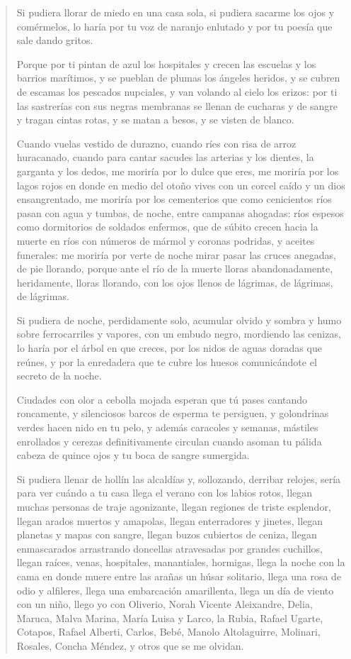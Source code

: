 \documentclass[12pt]{article}
\begin{document}
\clearpage
{}
\begin{verse}
Si pudiera llorar de miedo en una casa sola,
si pudiera sacarme los ojos y comérmelos,
lo haría por tu voz de naranjo enlutado
y por tu poesía que sale dando gritos.

Porque por ti pintan de azul los hospitales
y crecen las escuelas y los barrios marítimos,
y se pueblan de plumas los ángeles heridos,
y se cubren de escamas los pescados nupciales,
y van volando al cielo los erizos:
por ti las sastrerías con sus negras membranas
se llenan de cucharas y de sangre
y tragan cintas rotas, y se matan a besos,
y se visten de blanco.

Cuando vuelas vestido de durazno,
cuando ríes con risa de arroz huracanado,
cuando para cantar sacudes las arterias y los dientes,
la garganta y los dedos,
me moriría por lo dulce que eres,
me moriría por los lagos rojos
en donde en medio del otoño vives
con un corcel caído y un dios ensangrentado,
me moriría por los cementerios
que como cenicientos ríos pasan
con agua y tumbas,
de noche, entre campanas ahogadas:
ríos espesos como dormitorios
de soldados enfermos, que de súbito crecen
hacia la muerte en ríos con números de mármol
y coronas podridas, y aceites funerales:
me moriría por verte de noche
mirar pasar las cruces anegadas,
de pie llorando,
porque ante el río de la muerte lloras
abandonadamente, heridamente,
lloras llorando, con los ojos llenos
de lágrimas, de lágrimas, de lágrimas.

Si pudiera de noche, perdidamente solo,
acumular olvido y sombra y humo
sobre ferrocarriles y vapores,
con un embudo negro,
mordiendo las cenizas,
lo haría por el árbol en que creces,
por los nidos de aguas doradas que reúnes,
y por la enredadera que te cubre los huesos
comunicándote el secreto de la noche.

Ciudades con olor a cebolla mojada
esperan que tú pases cantando roncamente,
y silenciosos barcos de esperma te persiguen,
y golondrinas verdes hacen nido en tu pelo,
y además caracoles y semanas,
mástiles enrollados y cerezas
definitivamente circulan cuando asoman
tu pálida cabeza de quince ojos
y tu boca de sangre sumergida.

Si pudiera llenar de hollín las alcaldías
y, sollozando, derribar relojes,
sería para ver cuándo a tu casa
llega el verano con los labios rotos,
llegan muchas personas de traje agonizante,
llegan regiones de triste esplendor,
llegan arados muertos y amapolas,
llegan enterradores y jinetes,
llegan planetas y mapas con sangre,
llegan buzos cubiertos de ceniza,
llegan enmascarados arrastrando doncellas
atravesadas por grandes cuchillos,
llegan raíces, venas, hospitales,
manantiales, hormigas,
llega la noche con la cama en donde
muere entre las arañas un húsar solitario,
llega una rosa de odio y alfileres,
llega una embarcación amarillenta,
llega un día de viento con un niño,
llego yo con Oliverio, Norah
Vicente Aleixandre, Delia,
Maruca, Malva Marina, María Luisa y Larco,
la Rubia, Rafael Ugarte,
Cotapos, Rafael Alberti,
Carlos, Bebé, Manolo Altolaguirre,
Molinari,
Rosales, Concha Méndez,
y otros que se me olvidan.


\end{verse}
\end{document}
